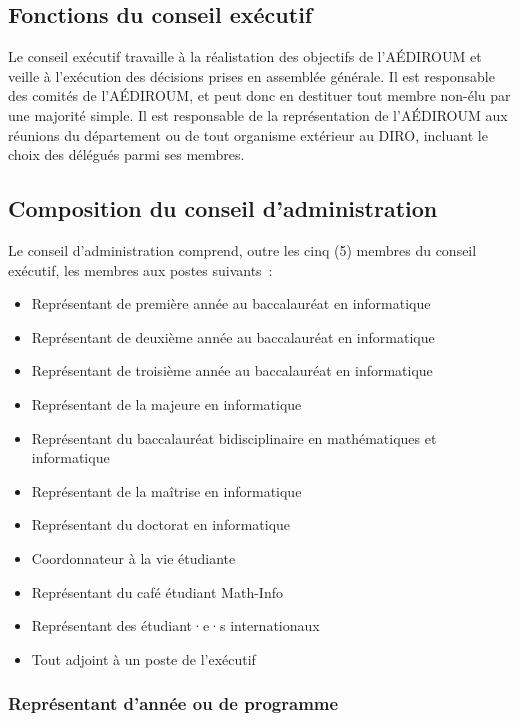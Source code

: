 \documentclass{aediroum}
\begin{document}
\subsection{Fonctions du conseil exécutif}\label{sec:fonctions-du-conseil-executif}

Le conseil exécutif travaille à la réalistation des objectifs de l'AÉDIROUM et veille à l'exécution des décisions prises en assemblée générale. Il est responsable des comités de l'AÉDIROUM, et peut donc en destituer tout membre non-élu par une majorité simple. Il est responsable de la représentation de l'AÉDIROUM aux réunions du département ou de tout organisme extérieur au DIRO, incluant le choix des délégués parmi ses membres.

\subsection{Composition du conseil d'administration}\label{sec:composition-du-conseil-dadministration}

Le conseil d'administration comprend, outre les cinq (5) membres du conseil exécutif, les membres aux postes suivants~:
\begin{itemize}
\item Représentant de première année au baccalauréat en informatique
\item Représentant de deuxième année au baccalauréat en informatique
\item Représentant de troisième année au baccalauréat en informatique
\item Représentant de la majeure en informatique
\item Représentant du baccalauréat bidisciplinaire en mathématiques et informatique
\item Représentant de la maîtrise en informatique
\item Représentant du doctorat en informatique
\item Coordonnateur à la vie étudiante
\item Représentant du café étudiant Math-Info
\item Représentant des étudiant·e·s internationaux
\item Tout adjoint à un poste de l'exécutif
\end{itemize}

\subsubsection{Représentant d'année ou de programme}\label{sec:representant-dannee-ou-de-programme}
\end{document}
